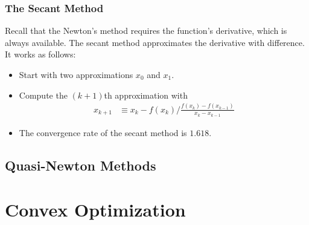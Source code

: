 \documentclass{memoir}
\begin{document}
\subsection{The Secant Method}
Recall that the Newton's method requires the function's derivative, which is always available. The secant method approximates the derivative with difference. It works as follows:
\begin{itemize}
  \item Start with two approximations $x_0$ and $x_1$.
  \item Compute the $(k+1)$th approximation with 
  \begin{align}
    x_{k+1} & \equiv x_k - f(x_k)/\frac{f(x_k) - f(x_{k-1})}{x_k - x_{k-1}}
  \end{align}
  \item The convergence rate of the secant method is $1.618$.

\end{itemize}

\section{Quasi-Newton Methods}

\chapter{Convex Optimization}

\printindex
\end{document}

